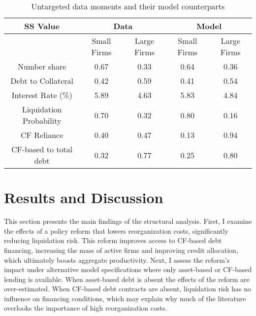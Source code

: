 \documentclass[12pt]{article}
\begin{document}
\begin{table}[h!]
    \centering
    \begin{tabular}{c|c|c||c|c}
    \textbf{SS Value} &  \multicolumn{2}{c}{\textbf{Data}} & \multicolumn{2}{c}{\textbf{Model}} \\ 
    \toprule
     & Small Firms & Large Firms & Small Firms & Large Firms  \\ 
    \midrule
    Number share & 0.67 & 0.33 & 0.64 & 0.36 \\ 
    Debt to Collateral & 0.42 & 0.59 & 0.41 & 0.54 \\ 
    Interest Rate (\%) & 5.89 & 4.63 & 5.83 & 4.84 \\ 
    Liquidation Probability & 0.70 & 0.32 & 0.80 & 0.16 \\ 
    CF Reliance & 0.40 & 0.47 & 0.13 & 0.94 \\ 
    CF-based to total debt & 0.32 & 0.77 & 0.25 & 0.80 \\ 
    \bottomrule
    \end{tabular}
    \caption{Untargeted data moments and their model counterparts}
    \label{tab:untargeted}
\end{table}


\section{Results and Discussion \label{sec:results}}

This section presents the main findings of the structural analysis. First, I examine the effects of a policy reform that lowers reorganization costs, significantly reducing liquidation risk. This reform improves access to CF-based debt financing, increasing the mass of active firms and improving credit allocation, which ultimately boosts aggregate productivity. Next, I assess the reform’s impact under alternative model specifications where only asset-based or CF-based lending is available. When asset-based debt is absent the effects of the reform are over-estimated. When CF-based debt contracts are absent, liquidation risk has no influence on financing conditions, which may explain why much of the literature overlooks the importance of high reorganization costs. 
\end{document}
